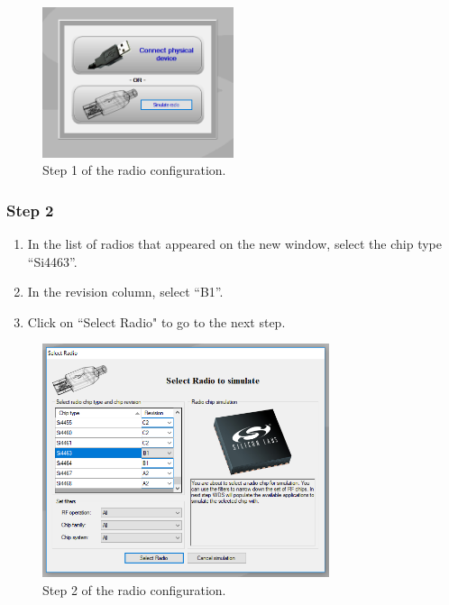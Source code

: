 \begin{figure}[!h]
	\begin{center}
		\includegraphics[width=0.5\textwidth]{figures/wds-tutorial/wds-tutorial-1.png}
		\caption{Step 1 of the radio configuration.}
		\label{fig:wds-tutorial-step-1}
	\end{center}
\end{figure}

\subsubsection{Step 2}

\begin{enumerate}
    \item In the list of radios that appeared on the new window, select the chip type ``Si4463''.
    \item In the revision column, select ``B1''.
    \item Click on ``Select Radio" to go to the next step.
\end{enumerate}

\begin{figure}[!h]
	\begin{center}
		\includegraphics[width=0.75\textwidth]{figures/wds-tutorial/wds-tutorial-2.png}
		\caption{Step 2 of the radio configuration.}
		\label{fig:wds-tutorial-step-2}
	\end{center}
\end{figure}

